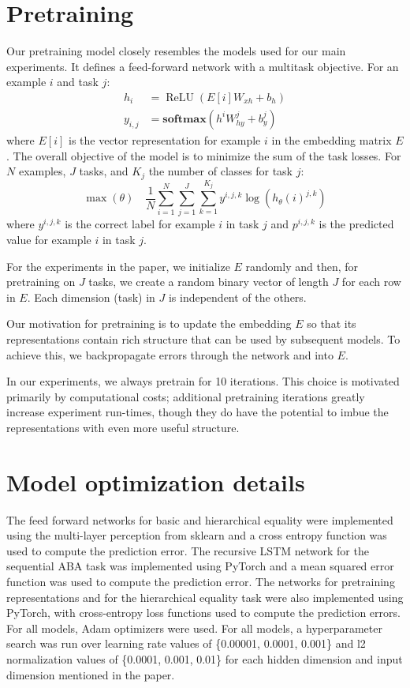 \documentclass{article}
\newcommand{\softmax}{\mathbf{softmax}}
\DeclareMathOperator{\ReLU}{ReLU}
\begin{document}
\section{Pretraining}\label{app:pretraining}

Our pretraining model closely resembles the models used for our main experiments. It defines a feed-forward network with a multitask objective. For an example $i$ and task $j$:
%
\begin{align}
  h_{i} &= \ReLU\left( E[i]W_{xh} + b_{h} \right) \\
  y_{i,j} &= \softmax(h^{i}W_{hy}^{j} + b_{y}^{j})
\end{align}
%
where $E[i]$ is the vector representation for example $i$ in the embedding matrix $E$. The overall objective of the model is to minimize the sum of the task losses. For $N$ examples, $J$ tasks, and $K_{j}$ the number of classes for task $j$:
%
\begin{equation}
  \max(\theta)
  \quad
  \frac{1}{N}
  \sum_{i=1}^{N}
  \sum_{j=1}^{J}
  \sum_{k=1}^{K_{j}}
  y^{i,j,k} \log \left( h_{\theta}(i)^{j,k} \right)
\end{equation}
%
where $y^{i,j,k}$ is the correct label for example $i$ in task $j$ and $p^{i,j,k}$ is the predicted value for example $i$ in task $j$.

For the experiments in the paper, we initialize $E$ randomly and then, for pretraining on $J$ tasks, we create a random binary vector of length $J$ for each row in $E$. Each dimension (task) in $J$ is independent of the others.

Our motivation for pretraining is to update the embedding $E$ so that its representations contain rich structure that can be used by subsequent models. To achieve this, we backpropagate errors through the network and into $E$.

In our experiments, we always pretrain for 10 iterations. This choice is motivated primarily by computational costs; additional pretraining iterations greatly increase experiment run-times, though they do have the potential to imbue the representations with even more useful structure.


\section{Model optimization details}\label{app:optimization}

The feed forward networks for basic and hierarchical equality were implemented using the multi-layer perception from sklearn and a cross entropy function was used to compute the prediction error. The recursive LSTM network for the sequential ABA task was implemented using PyTorch and a mean squared error function was used to compute the prediction error. The networks for pretraining representations and for the hierarchical equality task were also implemented using PyTorch, with cross-entropy loss functions used to compute the prediction errors. For all models, Adam optimizers \citep{Kingma:Ba:2015} were used. For all models, a hyperparameter search was run over learning rate values of \{0.00001, 0.0001, 0.001\} and l2 normalization values of \{0.0001, 0.001, 0.01\} for each hidden dimension and input dimension mentioned in the paper.
\end{document}
